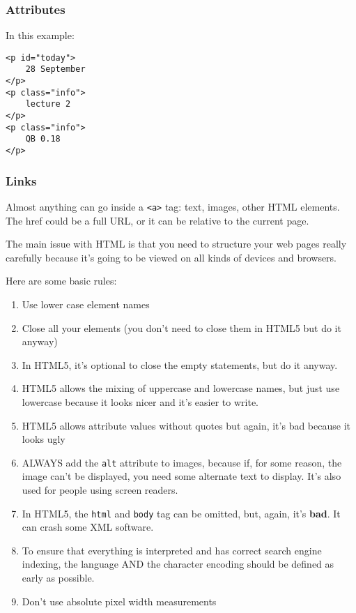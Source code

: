 \documentclass[11pt,a4paper,titlepage,dvipsnames,cmyk]{scrartcl}
\begin{document}
\subsubsection{Attributes}%
\label{ssub:Attributes}
In this example:
\begin{lstlisting}[style=B]
<p id="today">
    28 September
</p>
<p class="info">
    lecture 2
</p>
<p class="info">
    QB 0.18
</p>
\end{lstlisting}

\subsubsection{Links}%
\label{ssub:Links}
Almost anything can go inside a \lstinline|<a>| tag: text, images, other
HTML elements. The href could be a full URL, or it can be relative to the
current page.

The main issue with HTML is that you need to structure your web pages
really carefully because it's going to be viewed on all kinds of devices
and browsers.

Here are some basic rules:
\begin{enumerate}
    \item Use lower case element names
    \item Close all your elements (you don't need to close them in HTML5
        but do it anyway)
    \item In HTML5, it's optional to close the empty statements, but do it
        anyway.
    \item HTML5 allows the mixing of uppercase and lowercase names, but
        just use lowercase because it looks nicer and it's easier to
        write.
    \item HTML5 allows attribute values without quotes but again, it's bad
        because it looks ugly
    \item ALWAYS add the \lstinline|alt| attribute to images, because if,
        for some reason, the image can't be displayed, you need some
        alternate text to display. It's also used for people using screen
        readers.
    \item In HTML5, the \lstinline|html| and \lstinline|body| tag can be
        omitted, but, again, it's \textbf{bad}. It can crash some XML
        software.
    \item To ensure that everything is interpreted and has correct search
        engine indexing, the language AND the character encoding should be
        defined as early as possible.
    \item Don't use absolute pixel width measurements
\end{enumerate}
\end{document}
